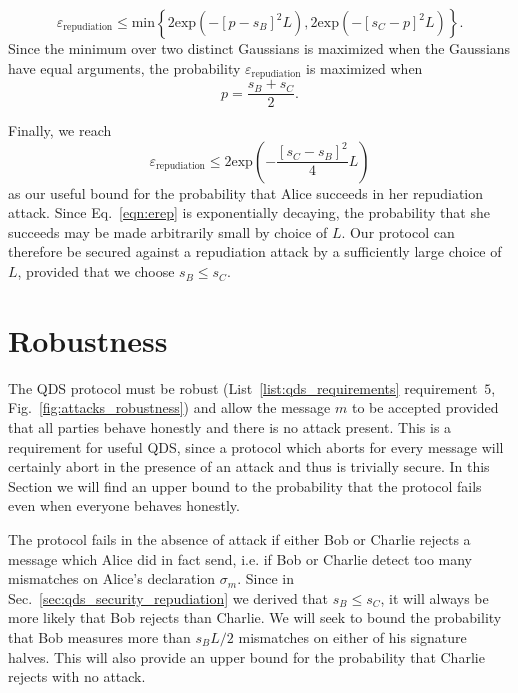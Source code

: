 \begin{equation}
\varepsilon_{\text{repudiation}} \le \text{min}\left\{ 2 \text{exp}\left( - \left[p - s_B\right]^2 L \right), 2 \text{exp}\left( - \left[s_C - p\right]^2 L \right) \right\}.
\end{equation}
Since the minimum over two distinct Gaussians is maximized when the Gaussians have equal arguments, the probability $\varepsilon_{\text{repudiation}}$ is maximized when 
\begin{equation}
p = \frac{s_B + s_C}{2}.
\end{equation}

\noindent Finally, we reach
\begin{equation}\label{eqn:erep}
\varepsilon_{\text{repudiation}} \le 2 \text{exp}\left( - \frac{\left[s_C - s_B\right]^2}{4} L\right)
\end{equation}
as our useful bound for the probability that Alice succeeds in her repudiation attack. Since Eq.~\ref{eqn:erep} is exponentially decaying, the probability that she succeeds may be made arbitrarily small by choice of $L$. Our protocol can therefore be secured against a repudiation attack by a sufficiently large choice of $L$, provided that we choose $s_B \le s_C$.




\section{Robustness}\label{sec:qds_security_robustness}
The QDS protocol must be robust (List~\ref{list:qds_requirements} requirement~$5$, Fig.~\ref{fig:attacks_robustness}) and allow the message $m$ to be accepted provided that all parties behave honestly and there is no attack present. This is a requirement for useful QDS, since a protocol which aborts for every message will certainly abort in the presence of an attack and thus is trivially secure. In this Section we will find an upper bound to the probability that the protocol fails even when everyone behaves honestly.

The protocol fails in the absence of attack if either Bob or Charlie rejects a message which Alice did in fact send, i.e. if Bob or Charlie detect too many mismatches on Alice's declaration $\sigma_m$. Since in Sec.~\ref{sec:qds_security_repudiation} we derived that $s_B \le s_C$, it will always be more likely that Bob rejects than Charlie. We will seek to bound the probability that Bob measures more than $s_B L/2$ mismatches on either of his signature halves. This will also provide an upper bound for the probability that Charlie rejects with no attack.

